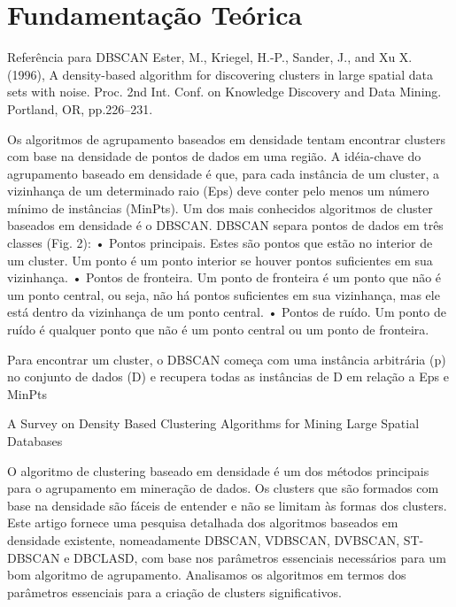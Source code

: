 \chapter{Fundamentação Teórica}
\label{cap:fundamentacao-teorica}

Referência para DBSCAN
Ester, M., Kriegel, H.-P., Sander, J., and Xu X. (1996), A density-based algorithm for discovering clusters in large spatial data sets with noise. Proc. 2nd Int. Conf. on Knowledge Discovery and Data Mining. Portland, OR, pp.226–231.







Os algoritmos de agrupamento baseados em densidade tentam encontrar clusters com base na densidade de pontos de dados em uma região. A idéia-chave do agrupamento baseado em densidade é que, para cada instância de um cluster, a vizinhança de um determinado raio (Eps) deve conter pelo menos um número mínimo de instâncias (MinPts). Um dos mais conhecidos algoritmos de cluster baseados em densidade é o DBSCAN. DBSCAN separa pontos de dados em três classes (Fig. 2):
• Pontos principais. Estes são pontos que estão no interior de um cluster. Um ponto é um ponto interior se houver pontos suficientes em sua vizinhança.
• Pontos de fronteira. Um ponto de fronteira é um ponto que não é um ponto central, ou seja, não há pontos suficientes em sua vizinhança, mas ele está dentro da vizinhança de um ponto central.
• Pontos de ruído. Um ponto de ruído é qualquer ponto que não é um ponto central ou um ponto de fronteira.

Para encontrar um cluster, o DBSCAN começa com uma instância arbitrária (p) no conjunto de dados (D) e recupera todas as instâncias de D em relação a Eps e MinPts











A Survey on Density Based Clustering Algorithms for Mining Large Spatial Databases

O algoritmo de clustering baseado em densidade é um dos métodos principais para o agrupamento em mineração de dados. Os clusters que são formados com base na densidade são fáceis de entender e não se limitam às formas dos clusters. Este artigo fornece uma pesquisa detalhada dos algoritmos baseados em densidade existente, nomeadamente DBSCAN, VDBSCAN, DVBSCAN, ST-DBSCAN e DBCLASD, com base nos parâmetros essenciais necessários para um bom algoritmo de agrupamento. Analisamos os algoritmos em termos dos parâmetros essenciais para a criação de clusters significativos.

